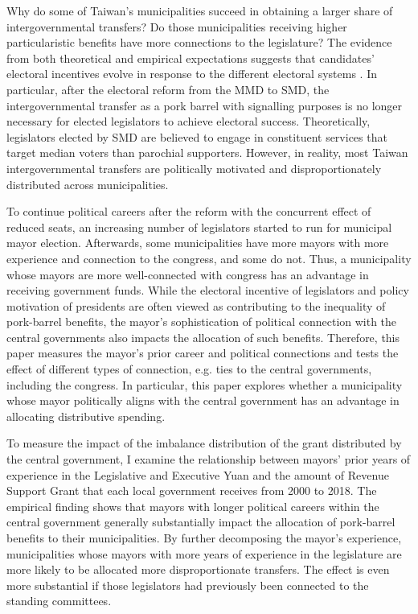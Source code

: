 Why do some of Taiwan\textquoteright s municipalities succeed in obtaining a larger share of intergovernmental transfers? Do those municipalities receiving higher particularistic benefits have more connections to the legislature? The evidence from both theoretical and empirical expectations suggests that candidates' electoral incentives evolve in response to the different electoral systems \citep[][]{Myerson1993, Cox1990}. In particular, after the electoral reform from the MMD to SMD, the intergovernmental transfer as a pork barrel with signalling purposes is no longer necessary for elected legislators to achieve electoral success. Theoretically, legislators elected by SMD are believed to engage in constituent services that target median voters than parochial supporters. However, in reality, most Taiwan intergovernmental transfers are politically motivated and disproportionately distributed across municipalities. 

To continue political careers after the reform with the concurrent effect of reduced seats, an increasing number of legislators started to run for municipal mayor election. Afterwards, some municipalities have more mayors with more experience and connection to the congress, and some do not. Thus, a municipality whose mayors are more well-connected with congress has an advantage in receiving government funds. While the electoral incentive of legislators and policy motivation of presidents are often viewed as contributing to the inequality of pork-barrel benefits, the mayor's sophistication of political connection with the central governments also impacts the allocation of such benefits. Therefore, this paper measures the mayor's prior career and political connections and tests the effect of different types of connection, e.g. ties to the central governments, including the congress. In particular, this paper explores whether a municipality whose mayor politically aligns with the central government has an advantage in allocating distributive spending. 

To measure the impact of the imbalance distribution of the grant distributed by the central government, I examine the relationship between mayors' prior years of experience in the Legislative and Executive Yuan and the amount of Revenue Support Grant that each local government receives from 2000 to 2018. The empirical finding shows that mayors with longer political careers within the central government generally substantially impact the allocation of pork-barrel benefits to their municipalities. By further decomposing the mayor's experience, municipalities whose mayors with more years of experience in the legislature are more likely to be allocated more disproportionate transfers. The effect is even more substantial if those legislators had previously been connected to the standing committees. 

